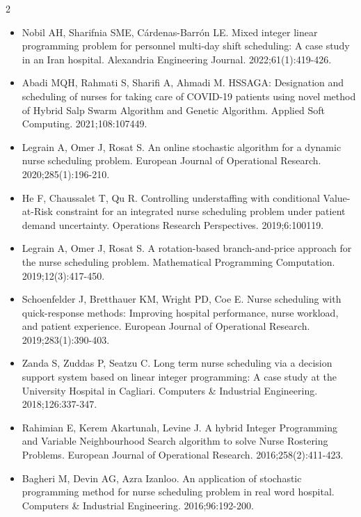 \documentclass[1pt,a4paper]{article}
\begin{document}
\begin{multicols}{2}
\begin{itemize}[leftmargin=*]
\item [9] Nobil AH, Sharifnia SME, Cárdenas-Barrón LE. Mixed integer linear programming problem for personnel multi-day shift scheduling: A case study in an Iran hospital. Alexandria Engineering Journal. 2022;61(1):419-426.

\item [10] Abadi MQH, Rahmati S, Sharifi A, Ahmadi M. HSSAGA: Designation and scheduling of nurses for taking care of COVID-19 patients using novel method of Hybrid Salp Swarm Algorithm and Genetic Algorithm. Applied Soft Computing. 2021;108:107449.

\item [11] Legrain A, Omer J, Rosat S. An online stochastic algorithm for a dynamic nurse scheduling problem. European Journal of Operational Research. 2020;285(1):196-210.

\item [12] He F, Chaussalet T, Qu R. Controlling understaffing with conditional Value-at-Risk constraint for an integrated nurse scheduling problem under patient demand uncertainty. Operations Research Perspectives. 2019;6:100119.

\item [13] Legrain A, Omer J, Rosat S. A rotation-based branch-and-price approach for the nurse scheduling problem. Mathematical Programming Computation. 2019;12(3):417-450.

\item [14] Schoenfelder J, Bretthauer KM, Wright PD, Coe E. Nurse scheduling with quick-response methods: Improving hospital performance, nurse workload, and patient experience. European Journal of Operational Research. 2019;283(1):390-403.

\item [15] Zanda S, Zuddas P, Seatzu C. Long term nurse scheduling via a decision support system based on linear integer programming: A case study at the University Hospital in Cagliari. Computers \& Industrial Engineering. 2018;126:337-347.

\item [16] Rahimian E, Kerem Akartunalı, Levine J. A hybrid Integer Programming and Variable Neighbourhood Search algorithm to solve Nurse Rostering Problems. European Journal of Operational Research. 2016;258(2):411-423.

\item [17] Bagheri M, Devin AG, Azra Izanloo. An application of stochastic programming method for nurse scheduling problem in real word hospital. Computers \& Industrial Engineering. 2016;96:192-200.


\end{itemize}
\end{multicols}
\end{document}
